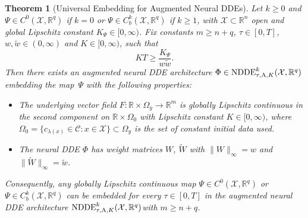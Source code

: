 \documentclass[10pt]{article}
\numberwithin{equation}{section}
\newtheorem{theorem}{Theorem}[section]
\newcommand\normm[1]{\big\lVert#1\big\lVert}
\begin{document}
	\begin{theorem}[Universal Embedding for Augmented Neural DDEs] \label{th:universalaugmented}
		Let $k \geq 0$ and $\Psi\in C^0(\mathcal{X}, \mathbb{R}^q)$ if $k = 0$ or $\Psi\in C^k_b(\mathcal{X},\mathbb{R}^q)$ if $k\geq 1$, with $\mathcal{X}\subset \mathbb{R}^n$ open and global Lipschitz constant $K_\Psi\in[0,\infty)$. Fix constants $m \geq n+q$, $\tau \in [0,T]$, $w,\tilde w\in (0,\infty)$ and $K \in [0,\infty)$, such that $$K T \geq \frac{K_\Psi}{w \tilde{w}}.$$ Then there exists an augmented neural DDE architecture $\Phi \in \textup{NDDE}_{\tau,\textup{A},K}^k(\mathcal{X},\mathbb{R}^q)$  embedding the map~$\Psi$ with the following properties:
		\begin{itemize}
			\item The underlying vector field $F: \mathbb{R}\times \Omega_y\rightarrow \mathbb{R}^m$  is globally Lipschitz continuous in the second component on $\mathbb{R}\times \Omega_0$  with Lipschitz constant $K\in[0,\infty)$, where $\Omega_0 = \{c_{\lambda(x)}\in\mathcal{C}: x\in\mathcal{X}\}\subset \Omega_y$ is the set of constant initial data used.
			\item The neural DDE $\Phi$ has weight matrices $W$, $\widetilde{W}$ with $\normm{W}_\infty = w$ and $\normm{\widetilde{W}}_\infty = \tilde w$.
		\end{itemize}
		Consequently, any globally Lipschitz continuous map $\Psi\in C^0(\mathcal{X},\mathbb{R}^q)$ or $\Psi\in  C^k_b(\mathcal{X},\mathbb{R}^q)$ can be embedded for every $\tau \in [0,T]$ in the augmented neural DDE architecture $\textup{NDDE}^k_{\tau,\textup{A},K}(\mathcal{X},\mathbb{R}^q)$with $m \geq n+q$.
	\end{theorem}
	
\end{document}
